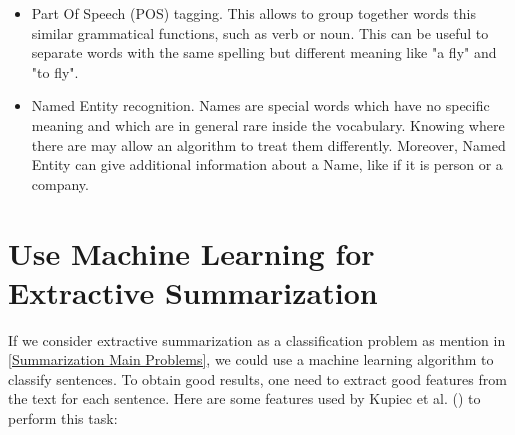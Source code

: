 \documentclass[11pt,a4paper,oldfontcommands]{memoir}
\begin{document}
\begin{itemize}

\item Part Of Speech (POS) tagging. This allows to group together words this similar grammatical functions, such as verb or noun. This can be useful to separate words with the same spelling but different meaning like "a fly" and "to fly".
\item Named Entity recognition. Names are special words which have no specific meaning and which are in general rare inside the vocabulary. Knowing where there are may allow an algorithm to treat them differently. Moreover, Named Entity can give additional information about a Name, like if it is person or a company.

\end{itemize}

\section{Use Machine Learning for Extractive Summarization}

If we consider extractive summarization as a classification problem as mention in \ref{Summarization Main Problems}, we could use a machine learning algorithm to classify sentences. To obtain good results, one need to extract good features from the text for each sentence. Here are some features used by Kupiec et al. (\cite{DBLP:conf/sigir/KupiecPC95}) to perform this task:
\end{document}
